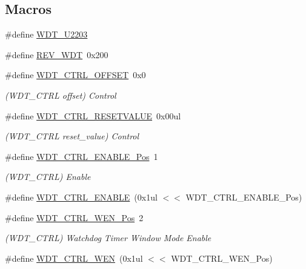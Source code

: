 \subsection*{Macros}
\begin{DoxyCompactItemize}
\item 
\#define \mbox{\hyperlink{group___s_a_m_d21___w_d_t_ga3ebf7f7e24bbd8ba6882f20c8be6fb5e}{W\+D\+T\+\_\+\+U2203}}
\item 
\#define \mbox{\hyperlink{group___s_a_m_d21___w_d_t_ga2a81abc78d42c7d555d128b152388248}{R\+E\+V\+\_\+\+W\+DT}}~0x200
\item 
\#define \mbox{\hyperlink{group___s_a_m_d21___w_d_t_ga39ce1d747040701b9eea15b5d13b143a}{W\+D\+T\+\_\+\+C\+T\+R\+L\+\_\+\+O\+F\+F\+S\+ET}}~0x0
\begin{DoxyCompactList}\small\item\em (W\+D\+T\+\_\+\+C\+T\+RL offset) Control \end{DoxyCompactList}\item 
\#define \mbox{\hyperlink{group___s_a_m_d21___w_d_t_gaf6861aac3ab874656280252bddd092c6}{W\+D\+T\+\_\+\+C\+T\+R\+L\+\_\+\+R\+E\+S\+E\+T\+V\+A\+L\+UE}}~0x00ul
\begin{DoxyCompactList}\small\item\em (W\+D\+T\+\_\+\+C\+T\+RL reset\+\_\+value) Control \end{DoxyCompactList}\item 
\#define \mbox{\hyperlink{group___s_a_m_d21___w_d_t_ga867342c84f6255deee61f27b89cdfe4e}{W\+D\+T\+\_\+\+C\+T\+R\+L\+\_\+\+E\+N\+A\+B\+L\+E\+\_\+\+Pos}}~1
\begin{DoxyCompactList}\small\item\em (W\+D\+T\+\_\+\+C\+T\+RL) Enable \end{DoxyCompactList}\item 
\#define \mbox{\hyperlink{group___s_a_m_d21___w_d_t_ga53c219e63346c837e0887d2f1c861e60}{W\+D\+T\+\_\+\+C\+T\+R\+L\+\_\+\+E\+N\+A\+B\+LE}}~(0x1ul $<$$<$ W\+D\+T\+\_\+\+C\+T\+R\+L\+\_\+\+E\+N\+A\+B\+L\+E\+\_\+\+Pos)
\item 
\#define \mbox{\hyperlink{group___s_a_m_d21___w_d_t_ga542d8e878e499ddbcaa56146cacce7c2}{W\+D\+T\+\_\+\+C\+T\+R\+L\+\_\+\+W\+E\+N\+\_\+\+Pos}}~2
\begin{DoxyCompactList}\small\item\em (W\+D\+T\+\_\+\+C\+T\+RL) Watchdog Timer Window Mode Enable \end{DoxyCompactList}\item 
\#define \mbox{\hyperlink{group___s_a_m_d21___w_d_t_ga969cdb53a5fcc6c7a10369839fd397ec}{W\+D\+T\+\_\+\+C\+T\+R\+L\+\_\+\+W\+EN}}~(0x1ul $<$$<$ W\+D\+T\+\_\+\+C\+T\+R\+L\+\_\+\+W\+E\+N\+\_\+\+Pos)

\end{DoxyCompactItemize}
